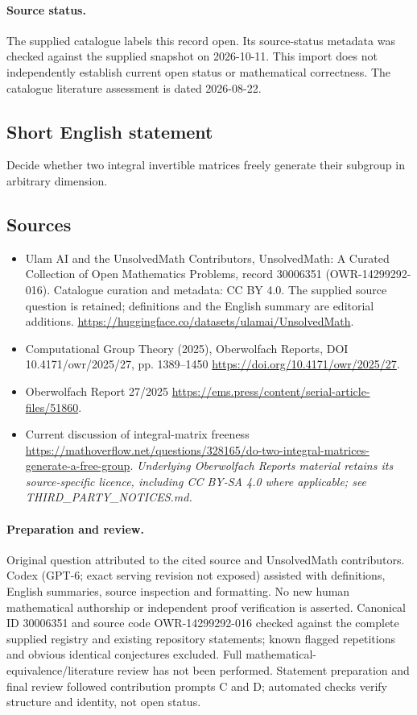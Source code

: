 \documentclass[11pt]{article}
\begin{document}
\paragraph{Source status.}
The supplied catalogue labels this record open. Its source-status metadata was checked against the supplied snapshot on 2026-10-11. This import does not independently establish current open status or mathematical correctness. The catalogue literature assessment is dated 2026-08-22.
\subsection{Short English statement}
Decide whether two integral invertible matrices freely generate their subgroup in arbitrary dimension.
\subsection{Sources}
\begin{itemize}
\item[S1] Ulam AI and the UnsolvedMath Contributors, UnsolvedMath: A Curated Collection of Open Mathematics Problems, record 30006351 (OWR-14299292-016). Catalogue curation and metadata: CC BY 4.0. The supplied source question is retained; definitions and the English summary are editorial additions.
\url{https://huggingface.co/datasets/ulamai/UnsolvedMath}.
\item[S2] Computational Group Theory (2025), Oberwolfach Reports, DOI 10.4171/owr/2025/27, pp. 1389--1450
\url{https://doi.org/10.4171/owr/2025/27}.
\item[S3] Oberwolfach Report 27/2025
\url{https://ems.press/content/serial-article-files/51860}.
\item[S4] Current discussion of integral-matrix freeness
\url{https://mathoverflow.net/questions/328165/do-two-integral-matrices-generate-a-free-group}.
\textit{Underlying Oberwolfach Reports material retains its source-specific licence, including CC BY-SA 4.0 where applicable; see THIRD\_PARTY\_NOTICES.md.}
\end{itemize}
\paragraph{Preparation and review.}
Original question attributed to the cited source and UnsolvedMath contributors. Codex (GPT-6; exact serving revision not exposed) assisted with definitions, English summaries, source inspection and formatting. No new human mathematical authorship or independent proof verification is asserted. Canonical ID 30006351 and source code OWR-14299292-016 checked against the complete supplied registry and existing repository statements; known flagged repetitions and obvious identical conjectures excluded. Full mathematical-equivalence/literature review has not been performed. Statement preparation and final review followed contribution prompts C and D; automated checks verify structure and identity, not open status.
\label{end:30006351}
\end{document}
